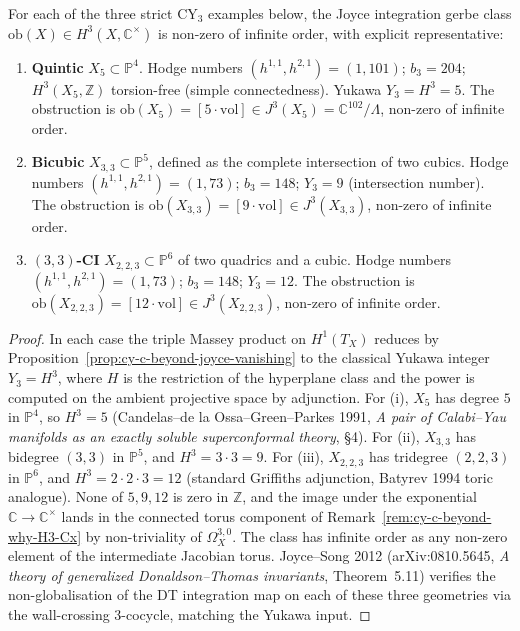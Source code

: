 \begin{proposition}
\label{prop:cy-c-beyond-joyce-three-CY3}
For each of the three strict CY$_3$ examples below, the Joyce integration gerbe
class $\mathrm{ob}(X) \in H^3(X, \mathbb{C}^\times)$ is non-zero of infinite
order, with explicit representative:
\begin{enumerate}[label=\textup{(\roman*)}]
 \item \textbf{Quintic} $X_5 \subset \mathbb{P}^4$. Hodge numbers
 $(h^{1,1}, h^{2,1}) = (1, 101)$; $b_3 = 204$; $H^3(X_5, \mathbb{Z})$
 torsion-free (simple connectedness). Yukawa $Y_3 = H^3 = 5$. The
 obstruction is $\mathrm{ob}(X_5) = [5 \cdot \mathrm{vol}] \in
 J^3(X_5) = \mathbb{C}^{102}/\Lambda$, non-zero of infinite order.
 \item \textbf{Bicubic} $X_{3,3} \subset \mathbb{P}^5$, defined as the complete
 intersection of two cubics. Hodge numbers $(h^{1,1}, h^{2,1}) = (1, 73)$;
 $b_3 = 148$; $Y_3 = 9$ (intersection number). The obstruction is
 $\mathrm{ob}(X_{3,3}) = [9 \cdot \mathrm{vol}] \in J^3(X_{3,3})$, non-zero
 of infinite order.
 \item \textbf{$(3,3)$-CI} $X_{2,2,3} \subset \mathbb{P}^6$ of two quadrics and a
 cubic. Hodge numbers $(h^{1,1}, h^{2,1}) = (1, 73)$; $b_3 = 148$; $Y_3 =
 12$. The obstruction is $\mathrm{ob}(X_{2,2,3}) = [12 \cdot \mathrm{vol}]
 \in J^3(X_{2,2,3})$, non-zero of infinite order.
\end{enumerate}
\end{proposition}

\begin{proof}
In each case the triple Massey product on $H^1(T_X)$ reduces by
Proposition~\ref{prop:cy-c-beyond-joyce-vanishing} to the classical Yukawa
integer $Y_3 = H^3$, where $H$ is the restriction of the hyperplane class and
the power is computed on the ambient projective space by adjunction. For
(i), $X_5$ has degree $5$ in $\mathbb{P}^4$, so $H^3 = 5$ (Candelas--de la
Ossa--Green--Parkes 1991, \emph{A pair of Calabi--Yau manifolds as an exactly
soluble superconformal theory}, \S 4). For (ii), $X_{3,3}$ has bidegree $(3,3)$
in $\mathbb{P}^5$, and $H^3 = 3 \cdot 3 = 9$. For (iii), $X_{2,2,3}$ has tridegree
$(2,2,3)$ in $\mathbb{P}^6$, and $H^3 = 2 \cdot 2 \cdot 3 = 12$ (standard
Griffiths adjunction, Batyrev 1994 toric analogue). None of $5, 9, 12$ is zero in
$\mathbb{Z}$, and the image under the exponential $\mathbb{C} \to \mathbb{C}^\times$
lands in the connected torus component of
Remark~\ref{rem:cy-c-beyond-why-H3-Cx} by non-triviality of $\Omega^{3,0}_X$. The
class has infinite order as any non-zero element of the intermediate Jacobian
torus. Joyce--Song 2012 (arXiv:0810.5645, \emph{A theory of generalized
Donaldson--Thomas invariants}, Theorem~5.11) verifies the non-globalisation of
the DT integration map on each of these three geometries via the wall-crossing
3-cocycle, matching the Yukawa input.
\end{proof}

